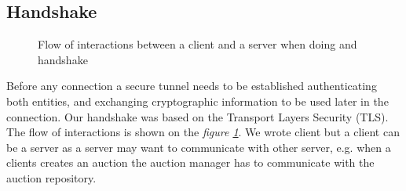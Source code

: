 \documentclass[12pt]{article}
\begin{document}
\subsection{Handshake}
\label{subsec:handshake}
\begin{figure}[h]
  \caption{Flow of interactions between a client and a server when doing and handshake}
  \label{fig:handshake}
\end{figure}
Before any connection a secure tunnel needs to be established authenticating both entities, 
  and exchanging cryptographic information to be used later in the connection. 
  Our handshake was based on the Transport Layers Security (TLS). 
  The flow of interactions is shown on the \textit{figure \ref{fig:handshake}}. We wrote client but a client can 
  be a server as a server may want to communicate with other server, e.g. when a clients
  creates an auction the auction manager has to communicate with the auction repository.
\end{document}
